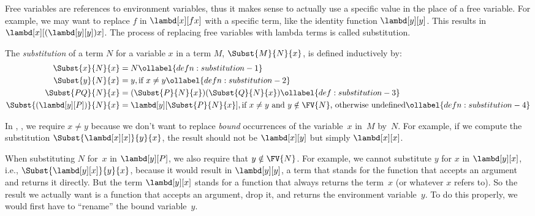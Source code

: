\documentclass[../../../include/open-logic-section]{subfiles}
\begin{document}

\begin{explain}
Free variables are references to environment variables, thus it makes
sense to actually use a specific value in the place of a free
variable. For example, we may want to replace $f$ in $\lambd[x][f x]$
with a specific term, like the identity function $\lambd[y][y]$. This
results in $\lambd[x][(\lambd[y][y]) x]$. The process of replacing
free variables with lambda terms is called substitution.
\end{explain}

\begin{defn}[Substitution] 
  The \emph{substitution} of a term $N$ for a variable $x$ in a term
  $M$, $\Subst{M}{N}{x}$, is defined inductively by:
  \begin{align}
    \Subst{x}{N}{x} & = N \ollabel{defn:substitution-1} \\
    \Subst{y}{N}{x} & = y, \text{if $x \neq y$} \ollabel{defn:substitution-2} \\
    \Subst{PQ}{N}{x} & = (\Subst{P}{N}{x}) (\Subst{Q}{N}{x})
    \ollabel{def:substitution-3} \\
    \Subst{(\lambd[y][P])}{N}{x}  & = 
      \lambd[y][\Subst{P}{N}{x}], \text{if $x \neq y$ and $y \notin \FV{N}$, otherwise undefined}
      \ollabel{defn:substitution-4}
  \end{align}
\end{defn}

\begin{explain}
In , , we require $x
\neq y$ because we don't want to replace \emph{bound} occurrences of
the variable~$x$ in~$M$ by~$N$.  For example, if we compute the
substitution $\Subst{\lambd[x][x]}{y}{x}$, the result should not be
$\lambd[x][y]$ but simply $\lambd[x][x]$.

When substituting $N$ for~$x$ in $\lambd[y][P]$, we also require that
$y \notin \FV{N}$.  For example, we cannot substitute $y$ for $x$ in
$\lambd[y][x]$, i.e., $\Subst{\lambd[y][x]}{y}{x}$, because it would
result in $\lambd[y][y]$, a term that stands for the function that
accepts an argument and returns it directly. But the term
$\lambd[y][x]$ stands for a function that always returns the term~$x$
(or whatever $x$ refers to). So the result we actually want is a
function that accepts an argument, drop it, and returns the
environment variable~$y$. To do this properly, we would first have to
``rename'' the bound variable~$y$.
\end{explain}
\end{document}
